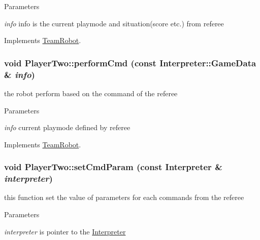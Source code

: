 \begin{DoxyParams}{Parameters}
\item[{\em info}]info is the current playmode and situation(score etc.) from referee \end{DoxyParams}


Implements \hyperlink{classTeamRobot_a71ec65db46db1ac511fe17b668d4f192}{TeamRobot}.

\hypertarget{classPlayerTwo_a56d794b718c60092a324f312b8333eb9}{
\subsubsection[{performCmd}]{\setlength{\rightskip}{0pt plus 5cm}void PlayerTwo::performCmd (const {\bf Interpreter::GameData} \& {\em info})}}
\label{classPlayerTwo_a56d794b718c60092a324f312b8333eb9}


the robot perform based on the command of the referee 


\begin{DoxyParams}{Parameters}
\item[{\em info}]current playmode defined by referee \end{DoxyParams}


Implements \hyperlink{classTeamRobot_a9b84df51ca16a7203fdb6498ea6741da}{TeamRobot}.

\hypertarget{classPlayerTwo_aa0294cf24297f66ffd92f1a250794340}{
\subsubsection[{setCmdParam}]{\setlength{\rightskip}{0pt plus 5cm}void PlayerTwo::setCmdParam (const {\bf Interpreter} \& {\em interpreter})}}
\label{classPlayerTwo_aa0294cf24297f66ffd92f1a250794340}


this function set the value of parameters for each commands from the referee 


\begin{DoxyParams}{Parameters}
\item[{\em interpreter}]is pointer to the \hyperlink{classInterpreter}{Interpreter} \end{DoxyParams}


